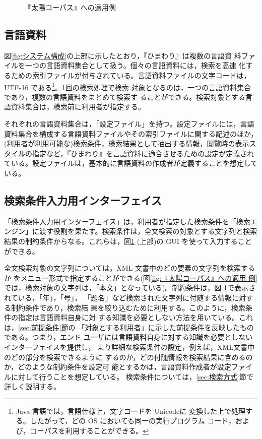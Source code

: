 \begin{figure}[hbt]
 \begin{center}
  \vspace{0.5em}
  \epsfxsize=13.5cm
  \caption{『太陽コーパス』への適用例}
  \label{fig:『太陽コーパス』への適用例}
 \end{center}   
\end{figure}



\subsection{言語資料}
図\ref{fig:システム構成}の上部に示したとおり，『ひまわり』は複数の言語資
料ファイルを一つの言語資料集合として扱う。個々の言語資料には，検索を高速
化するための索引ファイルが付与されている。言語資料ファイルの文字コードは，
UTF-16 である\footnote{Java 言語では，言語仕様上，文字コードを Unicodeに
変換した上で処理する。したがって，どの OS においても同一の実行プログラム
コード，および，コーパスを利用することができる。}。1回の検索処理で検索
対象となるのは，一つの言語資料集合であり，複数の言語資料をまとめて検索す
ることができる。検索対象とする言語資料集合は，検索前に利用者が指定する。

それぞれの言語資料集合は，「設定ファイル」を持つ。設定ファイルには，言語
資料集合を構成する言語資料ファイルやその索引ファイルに関する記述のほか，
(利用者が利用可能な)検索条件，検索結果として抽出する情報，閲覧時の表示ス
タイルの指定など，『ひまわり』を言語資料に適合させるための設定が定義され
ている。設定ファイルは，基本的に言語資料の作成者が定義することを想定して
いる。



\subsection{検索条件入力用インターフェイス}
「検索条件入力用インターフェイス」は，利用者が指定した検索条件を「検索エ
ンジン」に渡す役割を果たす。検索条件は，全文検索の対象とする文字列と検索
結果の制約条件からなる。これらは，図\ref{fig:『太陽コーパス』への適用例}
(上部)の GUI を使って入力することができる。

全文検索対象の文字列については，XML 文書中のどの要素の文字列を検索するか
をメニュー形式で指定することができる(図\ref{fig:『太陽コーパス』への適用
例}では，検索対象の文字列は，「本文」となっている)。制約条件は，図
\ref{fig:『太陽コーパス』への適用例}で表示されている，「年」，「号」，
「題名」など検索された文字列に付随する情報に対する制約条件であり，検索結
果を絞り込むために利用する。このように，検索条件の指定は言語資料自身に対
する知識を必要としない方法を用いている。これは，\ref{sec:前提条件}節の
「対象とする利用者」に示した前提条件を反映したものである。つまり，エンド
ユーザには言語資料自身に対する知識を必要としないインターフェイスを提供し，
より詳細な検索条件の設定，例えば，XML文書中のどの部分を検索できるように
するのか，どの付随情報を検索結果に含めるのか，どのような制約条件を設定可
能とするかは，言語資料作成者が設定ファイルに対して行うことを想定している。
検索条件については，\ref{sec:検索方式}節で詳しく説明する。

